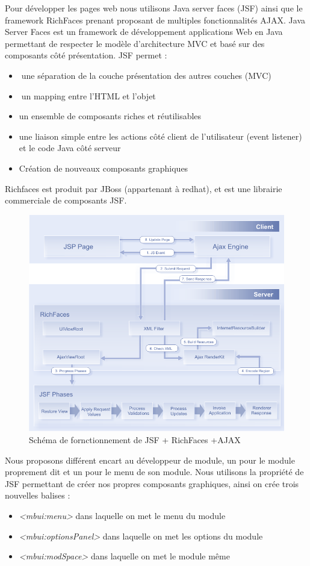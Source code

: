 Pour développer les pages web nous utilisons Java server faces (JSF) ainsi que le framework RichFaces prenant proposant de multiples fonctionnalités AJAX.  Java Server Faces est un framework de développement applications Web en Java permettant de respecter le modèle d’architecture MVC et basé sur des composants côté présentation.  JSF permet :\\
\begin{itemize}
\item une séparation de la couche présentation des autres couches (MVC)
\item un mapping entre l’HTML et l’objet
\item un ensemble de composants riches et réutilisables
\item une liaison simple entre les actions côté client de l'utilisateur (event listener) et le code Java côté serveur
\item Création de nouveaux composants graphiques
\end{itemize}
Richfaces est produit par JBoss (appartenant à redhat), et est une librairie commerciale de composants JSF.
\begin{figure}[position]
   \caption{Schéma de fornctionnement de JSF + RichFaces +AJAX }
   \includegraphics[scale=1]{a4jsfPhases.png} 
\end{figure}

Nous proposons différent encart au développeur de module, un pour le module proprement dit et un pour le menu de son module. Nous utilisons la propriété de JSF permettant de créer nos propres composants graphiques, ainsi on crée trois nouvelles balises :\\
\begin{itemize}
\item \textit{<mbui:menu>} dans laquelle on met le menu du module
\item \textit{<mbui:optionsPanel>} dans laquelle on met les options du module
\item \textit{<mbui:modSpace>} dans laquelle on met le module même
\end{itemize} 